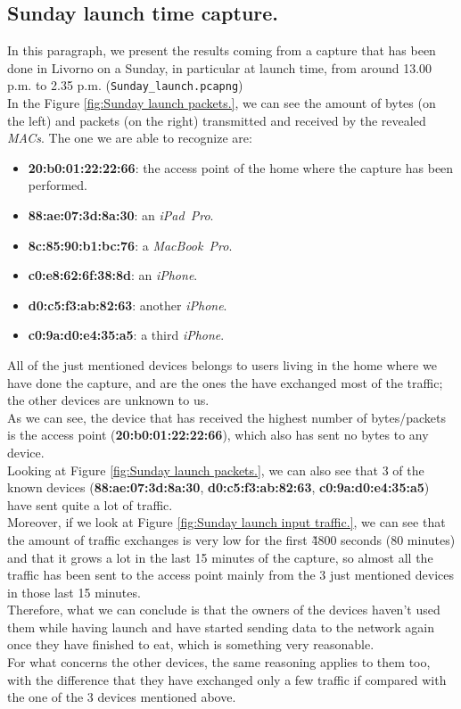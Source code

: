 \subsection{Sunday launch time capture.}
In this paragraph, we present the results coming from a capture that has been done in Livorno on a Sunday, in particular at
launch time, from around 13.00 p.m. to 2.35 p.m. (\texttt{Sunday\_launch.pcapng})\\ 
In the Figure \ref{fig:Sunday launch packets.}, we can see the amount of bytes (on the left) and packets (on the right)
transmitted and received by the revealed \textit{MACs}. The one we are able to recognize are:
\begin{itemize}
    \item \textbf{20:b0:01:22:22:66}: the access point of the home where the capture has been performed.
    \item \textbf{88:ae:07:3d:8a:30}: an \textit{iPad\ Pro}.
    \item \textbf{8c:85:90:b1:bc:76}: a \textit{MacBook\ Pro}.
    \item \textbf{c0:e8:62:6f:38:8d}: an \textit{iPhone}.
    \item \textbf{d0:c5:f3:ab:82:63}: another \textit{iPhone}.
    \item \textbf{c0:9a:d0:e4:35:a5}: a third \textit{iPhone}.
\end{itemize}
All of the just mentioned devices belongs to users living in the home where we have done the capture, and are the ones the have
exchanged most of the traffic; the other devices are unknown to us.\\
As we can see, the device that has received the highest number of bytes/packets is the access point (\textbf{20:b0:01:22:22:66}),
which also has sent no bytes to any device. \\
Looking at Figure \ref{fig:Sunday launch packets.}, we can also see that 3 of the known devices (\textbf{88:ae:07:3d:8a:30}, 
\textbf{d0:c5:f3:ab:82:63}, \textbf{c0:9a:d0:e4:35:a5}) have sent quite a lot of traffic.\\
Moreover, if we look at Figure \ref{fig:Sunday launch input traffic.}, we can see that the amount of traffic exchanges is very
low for the first \~4800 seconds (80 minutes) and that it grows a lot in the last 15 minutes of the capture, so almost all the 
traffic has been sent to the access point mainly from the 3 just mentioned devices in those last 15 minutes.\\
Therefore, what we can conclude is that the owners of the devices haven't used them while having launch and have started 
sending data to the network again once they have finished to eat, which is something very reasonable.\\
For what concerns the other devices, the same reasoning applies to them too, with the difference that they have exchanged only a 
few traffic if compared with the one of the 3 devices mentioned above. 

